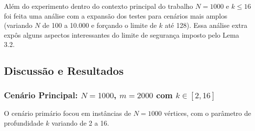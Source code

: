 \documentclass[10pt,a4paper]{article}
\begin{document}
Além do experimento dentro do contexto principal do trabalho $N = 1000$ e $k \le 16$ foi feita uma análise com a expansão dos testes para cenários mais amplos (variando $N$ de 100 a 10.000 e forçando o limite de $k$ até 128). Essa análise extra expôs alguns aspectos interessantes do limite de segurança imposto pelo Lema 3.2.
\subsection{Discussão e Resultados}

\subsubsection{Cenário Principal: $N=1000$, $m=2000$ com $k \in [2, 16]$}

O cenário primário focou em instâncias de $N=1000$ vértices, com o parâmetro de profundidade $k$ variando de 2 a 16.

\begin{table}[H]
\centering
\caption{Análise de Sensibilidade da Poda (Lema 3.2) em Grafos Esparsos N=1000. Tempos convertidos para milissegundos (ms).}
\label{tab:exp2_sensitivity}
\end{table}
\end{document}
